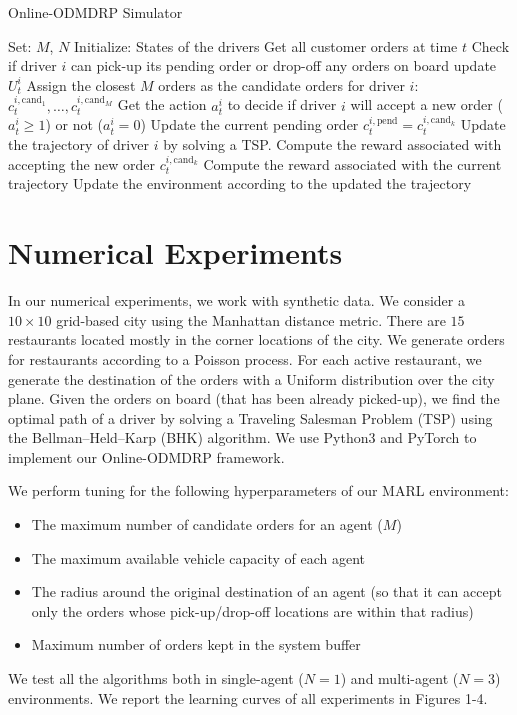 \documentclass{article}
\theoremstyle{defn}
\theoremstyle{prop}
\theoremstyle{assm}
\theoremstyle{theoremm}
\theoremstyle{remarkk}
\theoremstyle{lem}
\theoremstyle{example}
\theoremstyle{example}
\begin{document}
\begin{algorithm*}
\caption{Online-ODMDRP Simulator}
\label{alg:sim} 
\begin{algorithmic}[1]
\State Set: $M$, $N$
\State Initialize: States of the drivers
\State Get all customer orders at time $t$
\State Check if driver $i$ can pick-up its pending order or drop-off any orders on board
 {update $U_t^i$}
\EndIf
\State Assign the closest $M$ orders as the candidate orders for driver $i$:  $c_t^{i,\text{cand}_1}, \ldots, c_t^{i,\text{cand}_M}$
\State Get the action $a_t^i$ to decide if driver $i$ will accept a new order ($a_t^i \geq 1$) or not ($a_t^i=0$)
\State Update the current pending order $c_t^{i,\text{pend}} = c_t^{i,\text{cand}_k}$
\State Update the trajectory of driver $i$ by solving a TSP. 
\State Compute the reward associated with accepting the new order $c_t^{i,\text{cand}_k}$
\Else {} 
\State Compute the reward associated with the current trajectory
\EndIf
\State Update the environment according to the updated the trajectory
\EndFor
\EndFor
\end{algorithmic}
\end{algorithm*}
\section{Numerical Experiments}\label{exp}
In our numerical experiments, we work with synthetic data. We consider a $10 \times 10$ grid-based city using the Manhattan distance metric. There are $15$ restaurants located mostly in the corner locations of the city. We generate orders for restaurants according to a Poisson process. For each active restaurant, we generate the destination of the orders with a Uniform distribution over the city plane. Given the orders on board (that has been already picked-up), we find the optimal path of a driver by solving a Traveling Salesman Problem (TSP) using the Bellman–Held–Karp (BHK) algorithm. We use Python3 and PyTorch to implement our Online-ODMDRP framework.

We perform tuning for the following hyperparameters of our MARL environment: 
\begin{itemize}
    \item The maximum number of candidate orders for an agent ($M$)
    \item The maximum available vehicle capacity of each agent
    \item The radius around the original destination of an agent (so that it can accept only the orders whose pick-up/drop-off locations are within that radius)
    \item Maximum number of orders kept in the system buffer
\end{itemize} 
We test all the algorithms both in single-agent ($N =1$) and multi-agent ($N=3$) environments. We report the learning curves of all experiments in Figures 1-4.
\end{document}
